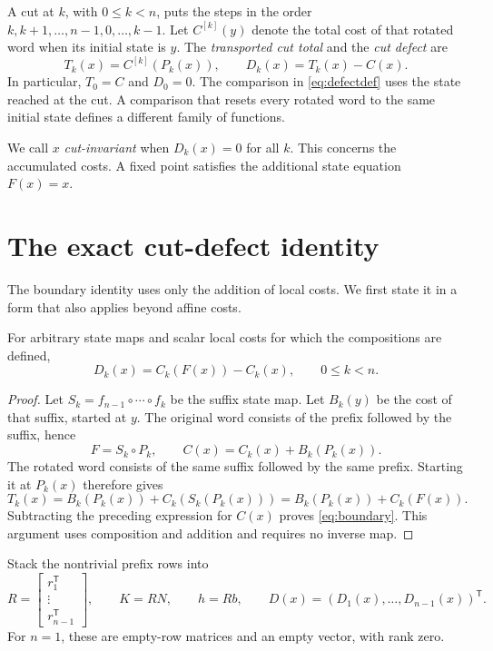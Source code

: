 \documentclass[11pt,a4paper]{article}
\theoremstyle{definition}\newtheorem{definition}[theorem]{Definition}\newtheorem{example}[theorem]{Example}\newtheorem{remark}[theorem]{Remark}
\begin{document}
A cut at $k$, with $0\le k<n$, puts the steps in the order
$k,k+1,\ldots,n-1,0,\ldots,k-1$. Let $C^{[k]}(y)$ denote the total cost
of that rotated word when its initial state is $y$.
The \emph{transported cut total} and the \emph{cut defect} are
\begin{equation}\label{eq:defectdef}
 T_k(x)=C^{[k]}(P_k(x)),\qquad D_k(x)=T_k(x)-C(x).
\end{equation}
In particular, $T_0=C$ and $D_0=0$. The comparison in
\eqref{eq:defectdef} uses the state reached at the cut. A comparison
that resets every rotated word to the same initial state defines a
different family of functions.

We call $x$ \emph{cut-invariant} when $D_k(x)=0$ for all $k$.
This concerns the accumulated costs. A fixed point satisfies the
additional state equation $F(x)=x$.

\section{The exact cut-defect identity}
The boundary identity uses only the addition of local costs. We first
state it in a form that also applies beyond affine costs.

\begin{lemma}\label{lem:boundary}
For arbitrary state maps and scalar local costs for which the
compositions are defined,
\begin{equation}\label{eq:boundary}
 \boxed{D_k(x)=C_k(F(x))-C_k(x),\qquad 0\le k<n.}
\end{equation}
\end{lemma}
\begin{proof}
Let $S_k=f_{n-1}\circ\cdots\circ f_k$ be the suffix state map.
Let $B_k(y)$ be the cost of that suffix, started at $y$.
The original word consists of the prefix followed by the suffix, hence
\[
 F=S_k\circ P_k,\qquad C(x)=C_k(x)+B_k(P_k(x)).
\]
The rotated word consists of the same suffix followed by the same
prefix. Starting it at $P_k(x)$ therefore gives
\[
 T_k(x)=B_k(P_k(x))+C_k(S_k(P_k(x)))
       =B_k(P_k(x))+C_k(F(x)).
\]
Subtracting the preceding expression for $C(x)$ proves
\eqref{eq:boundary}. This argument uses composition and addition and
requires no inverse map.
\end{proof}

Stack the nontrivial prefix rows into
\begin{equation}\label{eq:RK}
 R=\begin{bmatrix}r_1^{\mathsf T}\\\vdots\\r_{n-1}^{\mathsf T}\end{bmatrix},
 \qquad K=RN,\qquad h=Rb,
 \qquad D(x)=(D_1(x),\ldots,D_{n-1}(x))^{\mathsf T}.
\end{equation}
For $n=1$, these are empty-row matrices and an empty vector, with rank
zero.
\end{document}
